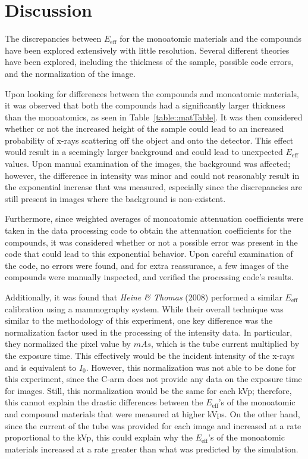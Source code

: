 \section{Discussion}

\par The discrepancies between $E_{\text{eff}}$ for the monoatomic materials and the compounds have been explored extensively with little resolution. Several different theories have been explored, including the thickness of the sample, possible code errors, and the normalization of the image.

\par Upon looking for differences between the compounds and monoatomic materials, it was observed that both the compounds had a significantly larger thickness than the monoatomics, as seen in Table~\ref{table::matTable}. It was then considered whether or not the increased height of the sample could lead to an increased probability of x-rays scattering off the object and onto the detector. This effect would result in a seemingly larger background and could lead to unexpected $E_{\text{eff}}$ values. Upon manual examination of the images, the background was affected; however, the difference in intensity was minor and could not reasonably result in the exponential increase that was measured, especially since the discrepancies are still present in images where the background is non-existent.

\par Furthermore, since weighted averages of monoatomic attenuation coefficients were taken in the data processing code to obtain the attenuation coefficients for the compounds, it was considered whether or not a possible error was present in the code that could lead to this exponential behavior. Upon careful examination of the code, no errors were found, and for extra reassurance, a few images of the compounds were manually inspected, and verified the processing code's results.

\par Additionally, it was found that \textit{Heine \& Thomas} (2008) \cite{Heine} performed a similar $E_{\text{eff}}$ calibration using a mammography system. While their overall technique was similar to the methodology of this experiment, one key difference was the normalization factor used in the processing of the intensity data. In particular, they normalized the pixel value by $mAs$, which is the tube current multiplied by the exposure time. This effectively would be the incident intensity of the x-rays and is equivalent to $I_0$. However, this normalization was not able to be done for this experiment, since the C-arm does not provide any data on the exposure time for images. Still, this normalization would be the same for each kVp; therefore, this cannot explain the drastic differences between the $E_{\text{eff}}$'s of the monoatomic and compound materials that were measured at higher kVps. On the other hand, since the current of the tube was provided for each image and increased at a rate proportional to the kVp, this could explain why the $E_{\text{eff}}$'s of the monoatomic materials increased at a rate greater than what was predicted by the simulation. 

